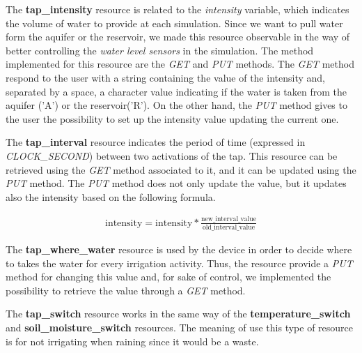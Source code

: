 The \textbf{tap\_intensity} resource is related to the \textit{intensity} variable, which indicates the volume of water to provide at each simulation. Since we want to pull water form the aquifer or the reservoir, we made this resource observable in the way of better controlling the \textit{water level sensors} in the simulation. The method implemented for this resource are the \textit{GET} and \textit{PUT} methods. The \textit{GET} method respond to the user with a string containing the value of the intensity and, separated by a space, a character value indicating if the water is taken from the aquifer ('A') or the reservoir('R'). On the other hand, the \textit{PUT} method gives to the user the possibility to set up the intensity value updating the current one.

The \textbf{tap\_interval} resource indicates the period of time (expressed in \textit{CLOCK\_SECOND}) between two activations of the tap. This resource can be retrieved using the \textit{GET} method associated to it, and it can be updated using the \textit{PUT} method. The \textit{PUT} method does not only update the value, but it updates also the intensity based on the following formula.

\begin{equation}\label{eq1}
  \begin{gathered}
    \text{intensity} = \text{intensity} * \frac{\text{new\_interval\_value}}{\text{old\_interval\_value}}
  \end{gathered}
\end{equation}

The \textbf{tap\_where\_water} resource is used by the device in order to decide where to takes the water for every irrigation activity. Thus, the resource provide a \textit{PUT} method for changing this value and, for sake of control, we implemented the possibility to retrieve the value through a \textit{GET} method.

The \textbf{tap\_switch} resource works in the same way of the \textbf{temperature\_switch} and \textbf{soil\_moisture\_switch} resources. The meaning of use this type of resource is for not irrigating when raining since it would be a waste.